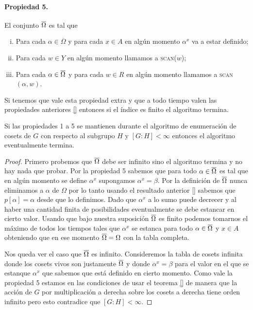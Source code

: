 \documentclass[tesis.tex]{subfiles}
\newcommand{\scan}{\textsc{scan}}
\begin{document}
\paragraph{\textbf{Propiedad 5.}} \label{coset-enum_p5} El conjunto $\overline \Omega$ es tal que
\begin{enumerate}[(i)]
	\item Para cada $\alpha \in \overline \Omega$ y para cada $x \in A$ en algún momento $\alpha^x$ va a estar definido;
	\item Para cada $w \in Y$ en algún momento llamamos a \scan($w$);
	\item Para cada $\alpha \in \overline \Omega$ y para cada $w \in R$ en algún momento llamamos a \scan$(\alpha, w)$.
\end{enumerate}

Si tenemos que vale esta propiedad extra y que a todo tiempo valen las propiedades anteriores \ref{} entonces si el índice es finito el algoritmo termina.

\begin{teo}
	Si las propiedades 1 a 5 se mantienen durante el algoritmo de enumeración de cosets de $G$ con respecto al subgrupo $H$ y $[G:H] < \infty$ entonces el algoritmo eventualmente termina.
\end{teo}

\begin{proof}
	Primero probemos que $\overline \Omega$ debe ser infinito sino el algoritmo termina y no hay nada que probar.
	Por la propiedad 5 sabemos que para todo $\alpha \in \overline \Omega$ es tal que en algún momento se define $\alpha^x$ supongamos $\alpha^x = \beta$. 
	Por la definición de $\overline \Omega$ nunca eliminamos a $\alpha$ de $\Omega$ por lo tanto usando el resultado anterior \ref{} sabemos que $p[\alpha] = \alpha$ desde que lo definimos.
	Dado que $\alpha^x$ a lo sumo puede decrecer y al haber una cantidad finita de posibilidades eventualmente se debe estancar en cierto valor. 
	Usando que bajo nuestra suposición $\overline \Omega$ es finito podemos tomarnos el máximo de todos los tiempos tales que $\alpha^x$ se estanca para todo $\alpha \in \overline \Omega$ y $x \in A$ obteniendo que en ese momento $\overline \Omega = \Omega$ con la tabla completa.  
	
	Nos queda ver el caso que $\overline \Omega$ es infinito.
	Consideremos la tabla de cosets infinita donde los cosets vivos son justamente $\overline \Omega$ y donde $\alpha^x = \beta$ para el valor en el que se estanque $\alpha^x$ que sabemos que está definido en cierto momento. 
	Como vale la propiedad 5 estamos en las condiciones de usar el teorema \ref{} 
	de manera que la acción de $G$ por multiplicación a derecha sobre los cosets a derecha tiene orden infinito pero esto contradice que $[G:H] < \infty$.	
\end{proof}
\end{document}
